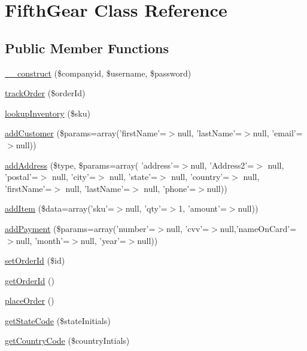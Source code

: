 \hypertarget{class_fifth_gear}{\section{Fifth\-Gear Class Reference}
\label{class_fifth_gear}
}
\subsection*{Public Member Functions}
\begin{DoxyCompactItemize}
\item 
\hyperlink{class_fifth_gear_adf4e616e25daf91a78964f0853a032df}{\-\_\-\-\_\-construct} (\$companyid, \$username, \$password)
\item 
\hyperlink{class_fifth_gear_aa7bcc53f332df499e18bcec3c0bea23b}{track\-Order} (\$order\-Id)
\item 
\hyperlink{class_fifth_gear_aedeca671f0702832e793e5ab1b919d73}{lookup\-Inventory} (\$sku)
\item 
\hyperlink{class_fifth_gear_a693da82e5ef878ca185ccb24823bd85f}{add\-Customer} (\$params=array('first\-Name'=$>$null, 'last\-Name'=$>$null, 'email'=$>$null))
\item 
\hyperlink{class_fifth_gear_a001746ed2ba506fde921da41ca0f5850}{add\-Address} (\$type, \$params=array( 'address'=$>$null, 'Address2'=$>$ null, 'postal'=$>$ null, 'city'=$>$ null, 'state'=$>$ null, 'country'=$>$ null, 'first\-Name'=$>$ null, 'last\-Name'=$>$ null, 'phone'=$>$null))
\item 
\hyperlink{class_fifth_gear_a679b1497cfc5c9ad7a42ff7ee42a86b6}{add\-Item} (\$data=array('sku'=$>$null, 'qty'=$>$1, 'amount'=$>$null))
\item 
\hyperlink{class_fifth_gear_a3ccb2efbb2243c4b166031a759f52a23}{add\-Payment} (\$params=array('number'=$>$null, 'cvv'=$>$null,'name\-On\-Card'=$>$null, 'month'=$>$null, 'year'=$>$null))
\item 
\hyperlink{class_fifth_gear_ab4e92a8fb430a8b181429034bf808cb6}{set\-Order\-Id} (\$id)
\item 
\hyperlink{class_fifth_gear_a112b9224ca91996b5a8827b26db96436}{get\-Order\-Id} ()
\item 
\hyperlink{class_fifth_gear_a49ec6e1dd50b0689b68ed1018cfc1b94}{place\-Order} ()
\item 
\hyperlink{class_fifth_gear_a986f911790038246d8838f56b296f711}{get\-State\-Code} (\$state\-Initials)
\item 
\hyperlink{class_fifth_gear_ad27b283984a05433928a925b1c80687d}{get\-Country\-Code} (\$country\-Intials)
\end{DoxyCompactItemize}
